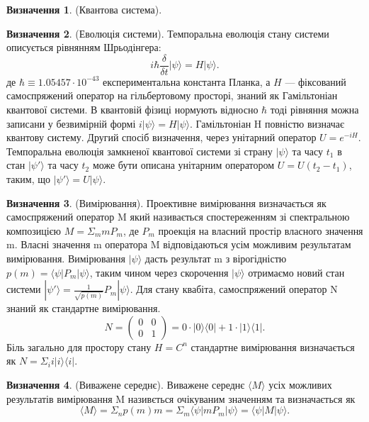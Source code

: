 \documentclass{article}
\theoremstyle{definition}
\newtheorem{definition}{Визначення}
\begin{document}
\begin{definition} (Квантова система).
\end{definition}

\begin{definition} (Еволюція системи).
Темпоральна еволюція стану системи описується рівнянням Шрьодінгера:
$$
i\hbar\frac{\delta}{\delta t}|\psi\rangle = H|\psi\rangle.
$$
де $\hbar \equiv 1.05457 \cdot 10^{-43}$ експериментальна константа Планка,
а $H$ --- фіксований самоспряжений оператор на гільбертовому просторі,
знаний як Гамільтоніан квантової системи. В квантовій фізиці нормують відносно
$\hbar$ тоді рівняння можна записани у безвимірній формі $i|\psi\rangle = H|\psi\rangle$.
Гамільтоніан H повністю визначає квантову систему.
Другий спосіб визначення, через унітарний оператор $U=e^{-iH}$.
Темпоральна еволюція замкненої квантової системи зі страну $|\psi\rangle$ та часу $t_1$
в стан $|\psi'\rangle$ та часу $t_2$ може бути описана унітарним оператором
$U = U (t_2 - t_1)$, таким, що $|\psi'\rangle = U |\psi\rangle$.
\end{definition}

\begin{definition} (Вимірювання).
Проективне вимірювання визначається як самоспряжений оператор M який називається
спостереженням зі спектральною композицією $M = \Sigma_m mP_m$, де $P_m$ проекція
на власний простір власного значення m. Власні значення m оператора M відповідаються
усім можливим результатам вимірювання. Вимірювання $|\psi\rangle$ дасть результат
m з вірогідністю $p(m) = \langle\psi|P_m|\psi\rangle$, таким чином через
скорочення $|\psi\rangle$ отримаємо новий стан системи $|\psi'\rangle = \frac{1}{\sqrt{p(m)}}P_m|\psi\rangle$.
Для стану квабіта, самоспряжений оператор N знаний як стандартне вимірювання.
$$
N = \begin{pmatrix} 0 & 0 \\ 0 & 1 \end{pmatrix} = 0 \cdot |0\rangle\langle 0| + 1 \cdot|1\rangle\langle1|.
$$
Біль загально для простору стану $H=C^n$ стандартне вимірювання визначається як $N=\Sigma_i i|i\rangle\langle i|$.
\end{definition}

\begin{definition} (Виважене середнє).
Виважене середнє $\langle M \rangle$ усіх можливих результатів вимірювання M називється
очікуваним значенням та визначається як
$$
\langle M\rangle = \Sigma_n p(m)m = \Sigma_m \langle\psi|m P_m|\psi\rangle = \langle \psi | M | \psi \rangle.
$$
\end{definition}
\end{document}
